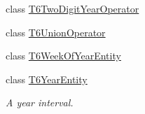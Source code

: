 \begin{DoxyCompactItemize}
class \hyperlink{classtask6_1_1t6Entities_1_1T6TwoDigitYearOperator}{T6\+Two\+Digit\+Year\+Operator}
\item 
class \hyperlink{classtask6_1_1t6Entities_1_1T6UnionOperator}{T6\+Union\+Operator}
\item 
class \hyperlink{classtask6_1_1t6Entities_1_1T6WeekOfYearEntity}{T6\+Week\+Of\+Year\+Entity}
\item 
class \hyperlink{classtask6_1_1t6Entities_1_1T6YearEntity}{T6\+Year\+Entity}
\begin{DoxyCompactList}\small\item\em A year interval. \end{DoxyCompactList}\end{DoxyCompactItemize}
